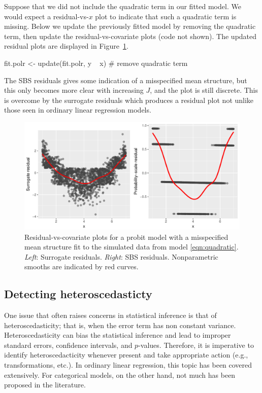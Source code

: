 Suppose that we did not include the quadratic term in our fitted model. We would expect a residual-vs-$x$ plot to indicate that such a quadratic term is missing. Below we update the previously fitted model by removing the quadratic term, then update the residual-vs-covariate plots (code not shown). The updated residual plots are displayed in Figure~\ref{fig:quadratic}.
\begin{example}
fit.polr <- update(fit.polr, y ~ x)  # remove quadratic term
\end{example}
The SBS residuals gives some indication of a misspecified mean structure, but this only becomes more clear with increasing $J$, and the plot is still discrete. This is overcome by the surrogate residuals which produces a residual plot not unlike those seen in ordinary linear regression models.

\begin{figure}[!htbp]
  \centering
  \includegraphics[width=1\textwidth]{quadratic}
  \caption{Residual-vs-covariate plots for a probit model with a misspecified mean structure fit to the simulated data from model \eqref{eqn:quadratic}. \textit{Left}: Surrogate residuals. \textit{Right}: SBS residuals. Nonparametric smooths are indicated by red curves.}
  \label{fig:quadratic}
\end{figure}


\subsection{Detecting heteroscedasticty}

One issue that often raises concerns in  statistical inference is that of heteroscedasticity; that is, when the error term has non constant variance. Heteroscedasticity can bias the statistical inference and lead to improper standard errors, confidence intervals, and $p$-values. Therefore, it is imperative to identify heteroscedacticity whenever present and take appropriate action (e.g., transformations, etc.). In ordinary linear regression, this topic has been covered extensively. For categorical models, on the other hand, not much has been proposed in the literature.

